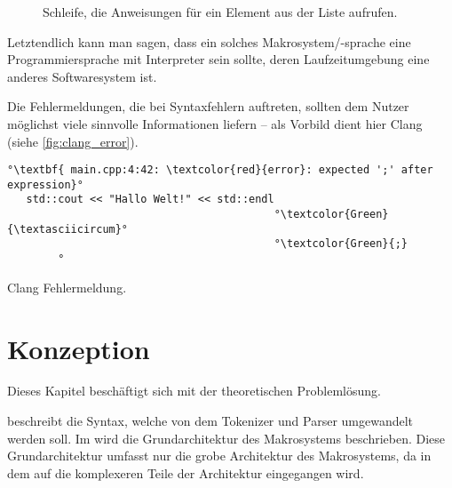     \begin{figure}[H]
      \centering
      \caption{Schleife, die Anweisungen für ein Element aus der Liste aufrufen.}
      \label{fig:loop}
    \end{figure}

    Letztendlich kann man sagen, dass ein solches Makrosystem/-sprache eine Programmiersprache mit Interpreter \autocite[S.274]{Gamma:1995:DPE:186897} sein sollte, deren Laufzeitumgebung eine anderes Softwaresystem ist.

    Die Fehlermeldungen, die bei Syntaxfehlern auftreten, sollten dem Nutzer möglichst viele sinnvolle Informationen liefern -- als Vorbild dient hier Clang (siehe \autoref{fig:clang_error}).

    \begin{myCodeEnv}
      \centering
      \begin{minipage}{.9\textwidth}
        \begin{lstlisting}[keepspaces,escapechar=°,numbers=none]
°\textbf{ main.cpp:4:42: \textcolor{red}{error}: expected ';' after expression}°
   std::cout << "Hallo Welt!" << std::endl
                                          °\textcolor{Green}{\textasciicircum}°
                                          °\textcolor{Green}{;}
        °\end{lstlisting}
      \end{minipage}
      \caption{Clang Fehlermeldung.}
      \label{fig:clang_error}
    \end{myCodeEnv}

\section{Konzeption}
\label{sec:Konzeption}
  Dieses Kapitel beschäftigt sich mit der theoretischen Problemlösung.

   beschreibt die Syntax, welche von dem Tokenizer und Parser umgewandelt werden soll. Im  wird die Grundarchitektur des Makrosystems beschrieben. Diese Grundarchitektur umfasst nur die grobe Architektur des Makrosystems, da in dem  auf die komplexeren Teile der Architektur eingegangen wird.

